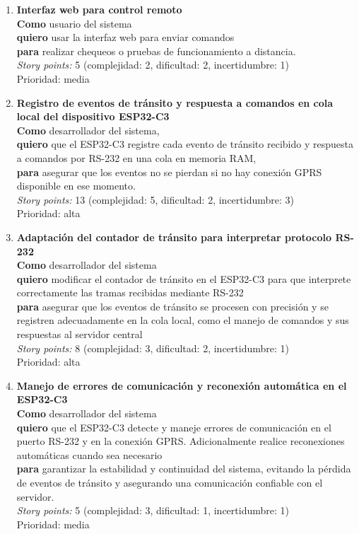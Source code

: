 \documentclass[
11pt, %
]{charter}
\begin{document}
\begin{enumerate}
\item \textbf{Interfaz web para control remoto}\\
\textbf{Como} usuario del sistema\\
\textbf{quiero} usar la interfaz web para enviar comandos\\
\textbf{para} realizar chequeos o pruebas de funcionamiento a distancia.\\
\textit{Story points:} 5 (complejidad: 2, dificultad: 2, incertidumbre: 1)\\
Prioridad: media

\item \textbf{Registro de eventos de tránsito y respuesta a comandos en cola local del dispositivo ESP32-C3}\\
\textbf{Como} desarrollador del sistema,\\
\textbf{quiero} que el ESP32-C3 registre cada evento de tránsito recibido y respuesta a comandos por RS-232 en una cola en memoria RAM,\\
\textbf{para} asegurar que los eventos no se pierdan si no hay conexión GPRS disponible en ese momento.\\
\textit{Story points:} 13 (complejidad: 5, dificultad: 2, incertidumbre: 3)\\
Prioridad: alta

\item \textbf{Adaptación del contador de tránsito para interpretar protocolo RS-232}\\
\textbf{Como} desarrollador del sistema\\
\textbf{quiero} modificar el contador de tránsito en el ESP32-C3 para que interprete correctamente las tramas recibidas mediante RS-232\\
\textbf{para} asegurar que los eventos de tránsito se procesen con precisión y se registren adecuadamente en la cola local, como el manejo de comandos y sus respuestas al servidor central\\
\textit{Story points:} 8 (complejidad: 3, dificultad: 2, incertidumbre: 1)\\
Prioridad: alta

\item \textbf{Manejo de errores de comunicación y reconexión automática en el ESP32-C3}\\
\textbf{Como} desarrollador del sistema\\
\textbf{quiero} que el ESP32-C3 detecte y maneje errores de comunicación en el puerto RS-232 y en la conexión GPRS. Adicionalmente realice reconexiones automáticas cuando sea necesario\\
\textbf{para} garantizar la estabilidad y continuidad del sistema, evitando la pérdida de eventos de tránsito y asegurando una comunicación confiable con el servidor.\\
\textit{Story points:} 5 (complejidad: 3, dificultad: 1, incertidumbre: 1)\\
Prioridad: media

\end{enumerate}
\end{document}

